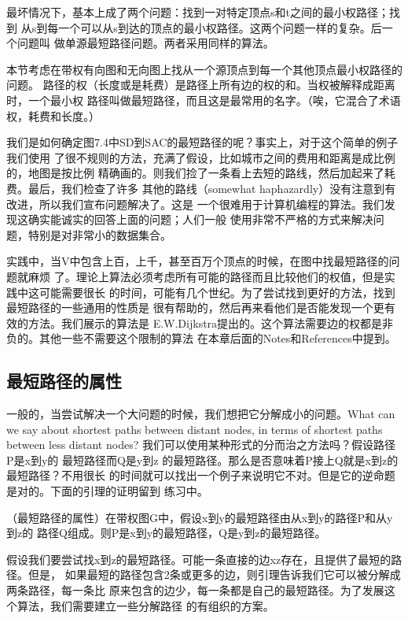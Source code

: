 最坏情况下，基本上成了两个问题：找到一对特定顶点s和t之间的最小权路径；找到
从s到每一个可以从s到达的顶点的最小权路径。这两个问题一样的复杂。后一个问题叫
做单源最短路径问题。两者采用同样的算法。

本节考虑在带权有向图和无向图上找从一个源顶点到每一个其他顶点最小权路径的问题。
路径的权（长度或是耗费）是路径上所有边的权的和。当权被解释成距离时，一个最小权
路径叫做最短路径，而且这是最常用的名字。（唉，它混合了术语权，耗费和长度。）

我们是如何确定图7.4中SD到SAC的最短路径的呢？事实上，对于这个简单的例子我们使用
了很不规则的方法，充满了假设，比如城市之间的费用和距离是成比例的，地图是按比例
精确画的。则我们捡了一条看上去短的路线，然后加起来了耗费。最后，我们检查了许多
其他的路线（somewhat haphazardly）没有注意到有改进，所以我们宣布问题解决了。这是
一个很难用于计算机编程的算法。我们发现这确实能诚实的回答上面的问题；人们一般
使用非常不严格的方式来解决问题，特别是对非常小的数据集合。

实践中，当V中包含上百，上千，甚至百万个顶点的时候，在图中找最短路径的问题就麻烦
了。理论上算法必须考虑所有可能的路径而且比较他们的权值，但是实践中这可能需要很长
的时间，可能有几个世纪。为了尝试找到更好的方法，找到最短路径的一些通用的性质是
很有帮助的，然后再来看他们是否能发现一个更有效的方法。我们展示的算法是
E.W.Dijkstra提出的。这个算法需要边的权都是非负的。其他一些不需要这个限制的算法
在本章后面的Notes和References中提到。



\subsection{最短路径的属性}
一般的，当尝试解决一个大问题的时候，我们想把它分解成小的问题。What can we say
about shortest paths between distant nodes, in terms of shortest paths between
less distant nodes? 我们可以使用某种形式的分而治之方法吗？假设路径P是x到y的
最短路径而Q是y到z 的最短路径。那么是否意味着P接上Q就是x到z的最短路径？不用很长
的时间就可以找出一个例子来说明它不对。但是它的逆命题是对的。下面的引理的证明留到
练习中。

\begin{lemma}
（最短路径的属性）在带权图G中，假设x到y的最短路径由从x到y的路径P和从y到z的
路径Q组成。则P是x到y的最短路径，Q是y到z的最短路径。
\end{lemma}

假设我们要尝试找x到z的最短路径。可能一条直接的边xz存在，且提供了最短的路径。但是，
如果最短的路径包含2条或更多的边，则引理告诉我们它可以被分解成两条路径，每一条比
原来包含的边少，每一条都是自己的最短路径。为了发展这个算法，我们需要建立一些分解路径
的有组织的方案。

